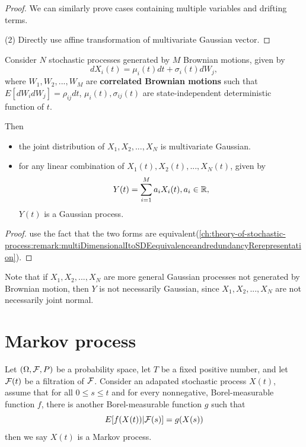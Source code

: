 \begin{refsection}
\begin{proof}
We can similarly prove cases containing multiple variables and drifting terms. 


(2) Directly use affine transformation of multivariate Gaussian vector.
\end{proof}


\begin{corollary}
	Consider $N$ stochastic processes generated by $M$ Brownian motions, given by
	$$dX_i(t) = \mu_i(t) dt + \sigma_i(t) dW_j,$$
	where $W_1,W_2,...,W_M$ are \textbf{correlated Brownian motions} such that $E[dW_idW_j] = \rho_{ij}dt$, $\mu_i(t), \sigma_{ij}(t)$ are state-independent deterministic function of $t$. 
	
	Then 
	\begin{itemize}
		\item the joint distribution of $X_1,X_2,...,X_N$ is multivariate Gaussian.
		\item for any linear combination of $X_1(t),X_2(t),...,X_N(t)$, given by
		$$Y(t) = \sum_{i=1}^M a_iX_i(t), a_i\in \mathbb{R},$$
		$Y(t)$ is a Gaussian process. 
	\end{itemize}
\end{corollary}
\begin{proof}
use the fact that the two forms are equivalent(\autoref{ch:theory-of-stochastic-process:remark:multiDimensionalItoSDEequivalenceandredundancyRerepresentation}).
\end{proof}



\begin{remark} 
Note that if $X_1,X_2,...,X_N$	are more general Gaussian processes not generated by Brownian motion, then $Y$ is not necessarily Gaussian, since $X_1,X_2,...,X_N$ are not necessarily joint normal.
\end{remark}





\section{Markov process}
\begin{definition}
\cite{shreve2004stochastic2}Let $(\Omega,\mathcal{F},P)$ be a probability space, let $T$ be a fixed positive number, and let $\mathcal{F}(t)$ be a filtration of $\mathcal{F}$. Consider an adapated stochastic process $X(t)$, assume that for all $0\leq s \leq t$ and for every nonnegative, Borel-measurable function $f$, there is another Borel-measurable function $g$ such that
$$E[f(X(t))|\mathcal{F}(s)] = g(X(s))$$
then we say $X(t)$ is a Markov process.  
\end{definition}


\end{refsection}
